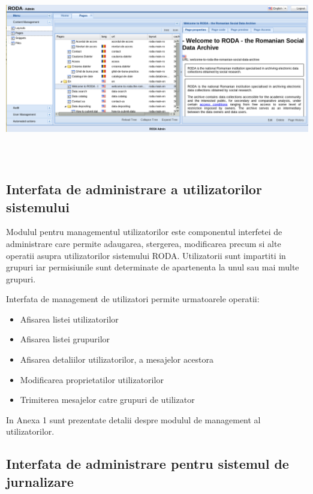 \documentclass[a4paper, 10pt]{article}
\begin{document}
{\begin{center}
\includegraphics[width=16.1cm,height=8.1cm]{cmspages.png}
\end{center}

\subsection*{Interfata de administrare a utilizatorilor sistemului}

Modulul pentru managementul utilizatorilor este componentul interfetei de administrare care permite adaugarea, stergerea, modificarea precum si alte operatii asupra utilizatorilor sistemului RODA. Utilizatorii sunt impartiti in grupuri iar permisiunile sunt determinate de apartenenta la unul sau mai multe grupuri. 


Interfata de management de utilizatori permite urmatoarele operatii:

\begin{itemize}
\item
Afisarea listei utilizatorilor
\item
Afisarea listei grupurilor
\item
Afisarea detaliilor utilizatorilor, a mesajelor acestora
\item
Modificarea proprietatilor utilizatorilor
\item
Trimiterea mesajelor catre grupuri de utilizator

\end{itemize}


\bigskip

In Anexa 1 sunt prezentate detalii despre modulul de management al utilizatorilor.



\subsection*{Interfata de administrare pentru sistemul de jurnalizare}


}
\end{document}
